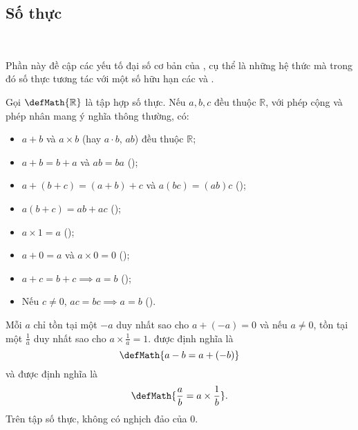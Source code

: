 \subsection{Số thực}

\ %

Phần này đề cập các yếu tố đại số cơ bản của , cụ thể là những hệ thức mà trong đó số thực tương tác với một số hữu hạn các  và . 

Gọi $\defMath{\mathbb{R}}$ là tập hợp số thực. Nếu $a, b, c$ đều thuộc $\mathbb{R}$, với phép cộng và phép nhân mang ý nghĩa thông thường, có:
\begin{itemize}
   \item $a + b$ và $a\times b$ (hay $a\cdot b$, $ab$) đều thuộc $\mathbb{R}$;
   \item $a+b=b+a$ và $ab=ba$ ();
   \item $a+(b+c)=(a+b)+c$ và $a(bc)=(ab)c$ ();
   \item $a(b+c)=ab+ac$ ();
   \item $a\times 1 = a$ ();
   \item $a + 0 = a$ và $a\times 0 = 0$ ();
   \item $a + c = b + c \implies a = b$ ();
   \item Nếu $c \neq 0$, $ac = bc \implies a = b$ ().
\end{itemize}

Mỗi $a$ chỉ tồn tại một  $-a$ duy nhất sao cho $a + (-a) = 0$ và nếu $a\neq 0$, tồn tại một  $\frac{1}{a}$ duy nhất sao cho $a\times \frac{1}{a} = 1$.  được định nghĩa là $$\defMath{a-b = a + (-b)}$$ và  được định nghĩa là $$\defMath{\frac{a}{b} = a\times \frac{1}{b}}.$$ Trên tập số thực, không có nghịch đảo của $0$.
